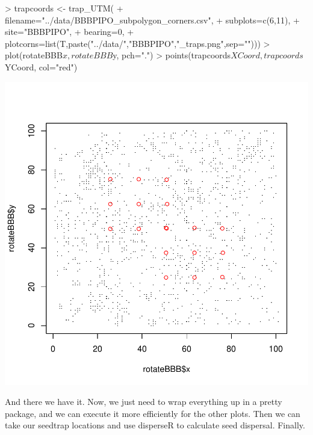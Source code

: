 \documentclass{article}
\begin{document}
\begin{Schunk}
\begin{Sinput}
> trapcoords <- trap_UTM(
+   filename="../data/BBBPIPO_subpolygon_corners.csv",
+   subplots=c(6,11),
+   site="BBBPIPO",
+   bearing=0,
+   plotcorns=list(T,paste("../data/","BBBPIPO","_traps.png",sep="")))
> plot(rotateBBB$x, rotateBBB$y, pch=".")
> points(trapcoords$XCoord, trapcoords$YCoord, col="red")
\end{Sinput}
\end{Schunk}
\includegraphics{SubPlotBoundaries-006}

And there we have it. Now, we just need to wrap everything up in a pretty package, and we can execute it more efficiently for the other plots. Then we can take our seedtrap locations and use disperseR to calculate seed dispersal. Finally.
\end{document}
